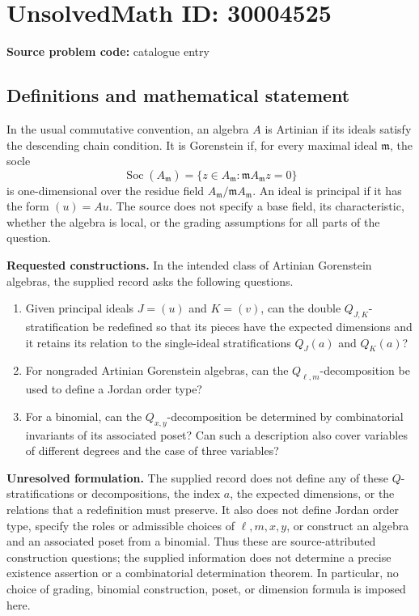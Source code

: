 \documentclass[11pt]{article}
\begin{document}
\section*{UnsolvedMath ID: 30004525}
\textbf{Source problem code:} catalogue entry
\subsection{Definitions and mathematical statement}
In the usual commutative convention, an algebra \(A\) is Artinian if its ideals satisfy the descending chain condition. It is Gorenstein if, for every maximal ideal \(\mathfrak m\), the socle
\[
\operatorname{Soc}(A_{\mathfrak m})=\{z\in A_{\mathfrak m}:\mathfrak m A_{\mathfrak m}z=0\}
\]
is one-dimensional over the residue field \(A_{\mathfrak m}/\mathfrak m A_{\mathfrak m}\). An ideal is principal if it has the form \((u)=Au\). The source does not specify a base field, its characteristic, whether the algebra is local, or the grading assumptions for all parts of the question.

\textbf{Requested constructions.} In the intended class of Artinian Gorenstein algebras, the supplied record asks the following questions.
\begin{enumerate}
\item Given principal ideals \(J=(u)\) and \(K=(v)\), can the double \(Q_{J,K}\)-stratification be redefined so that its pieces have the expected dimensions and it retains its relation to the single-ideal stratifications \(Q_J(a)\) and \(Q_K(a)\)?
\item For nongraded Artinian Gorenstein algebras, can the \(Q_{\ell,m}\)-decomposition be used to define a Jordan order type?
\item For a binomial, can the \(Q_{x,y}\)-decomposition be determined by combinatorial invariants of its associated poset? Can such a description also cover variables of different degrees and the case of three variables?
\end{enumerate}

\textbf{Unresolved formulation.} The supplied record does not define any of these \(Q\)-stratifications or decompositions, the index \(a\), the expected dimensions, or the relations that a redefinition must preserve. It also does not define Jordan order type, specify the roles or admissible choices of \(\ell,m,x,y\), or construct an algebra and an associated poset from a binomial. Thus these are source-attributed construction questions; the supplied information does not determine a precise existence assertion or a combinatorial determination theorem. In particular, no choice of grading, binomial construction, poset, or dimension formula is imposed here.
\end{document}
